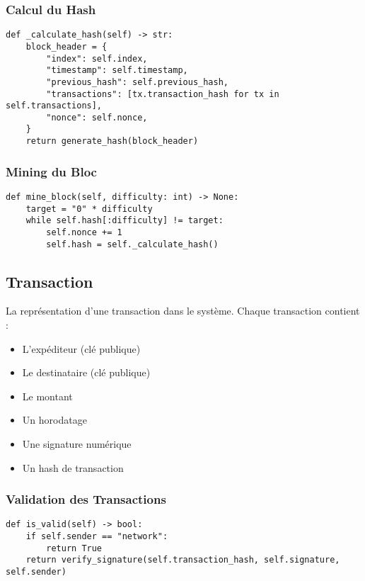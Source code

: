 \documentclass[french]{article}
\begin{document}
\subsubsection{Calcul du Hash}
\begin{lstlisting}[style=python, caption=Calcul du Hash d'un Bloc]
def _calculate_hash(self) -> str:
    block_header = {
        "index": self.index,
        "timestamp": self.timestamp,
        "previous_hash": self.previous_hash,
        "transactions": [tx.transaction_hash for tx in self.transactions],
        "nonce": self.nonce,
    }
    return generate_hash(block_header)
\end{lstlisting}

\subsubsection{Mining du Bloc}
\begin{lstlisting}[style=python, caption=Mining d'un Bloc]
def mine_block(self, difficulty: int) -> None:
    target = "0" * difficulty
    while self.hash[:difficulty] != target:
        self.nonce += 1
        self.hash = self._calculate_hash()
\end{lstlisting}

\subsection{Transaction}
La représentation d'une transaction dans le système. Chaque transaction contient :
\begin{itemize}
    \item L'expéditeur (clé publique)
    \item Le destinataire (clé publique)
    \item Le montant
    \item Un horodatage
    \item Une signature numérique
    \item Un hash de transaction
\end{itemize}

\subsubsection{Validation des Transactions}
\begin{lstlisting}[style=python, caption=Validation d'une Transaction]
def is_valid(self) -> bool:
    if self.sender == "network":
        return True
    return verify_signature(self.transaction_hash, self.signature, self.sender)
\end{lstlisting}
\end{document}
